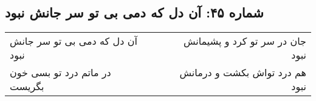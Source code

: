 \begin{center}
\section*{شماره ۴۵: آن دل که دمی بی تو سر جانش نبود}
\label{sec:045}
\begin{longtable}{l p{0.5cm} r}
آن دل که دمی بی تو سر جانش نبود
&&
جان در سر تو کرد و پشیمانش نبود
\\
در ماتم درد تو بسی خون بگریست
&&
هم درد تواش بکشت و درمانش نبود
\\
\end{longtable}
\end{center}
